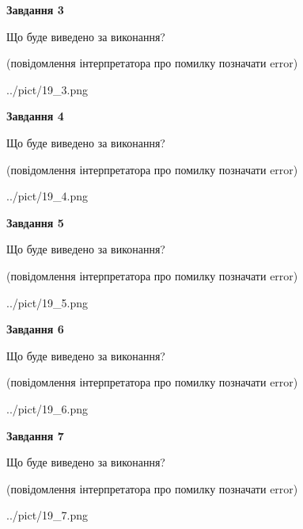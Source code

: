 \documentclass[12pt, ukrainian]{article}
\begin{document}
{\begin {large}
{\begin {center}\textbf{Завдання 3}\end {center}}\par
Що буде виведено за виконання?\par
 (повідомлення інтерпретатора про помилку позначати error)\par
\begin{center}
	{../pict/19_3.png}
\end{center}
\newpage

{\begin {center}\textbf{Завдання 4}\end {center}}\par
Що буде виведено за виконання?\par
 (повідомлення інтерпретатора про помилку позначати error)\par
\begin{center}
	{../pict/19_4.png}
\end{center}
\newpage

{\begin {center}\textbf{Завдання 5}\end {center}}\par
Що буде виведено за виконання?\par
 (повідомлення інтерпретатора про помилку позначати error)\par
\begin{center}
	{../pict/19_5.png}
\end{center}
\newpage

{\begin {center}\textbf{Завдання 6}\end {center}}\par
Що буде виведено за виконання?\par
 (повідомлення інтерпретатора про помилку позначати error)\par
\begin{center}
	{../pict/19_6.png}
\end{center}
\newpage

{\begin {center}\textbf{Завдання 7}\end {center}}\par
Що буде виведено за виконання?\par
 (повідомлення інтерпретатора про помилку позначати error)\par
\begin{center}
	{../pict/19_7.png}
\end{center}
\newpage


\end{large}}
\end{document}

